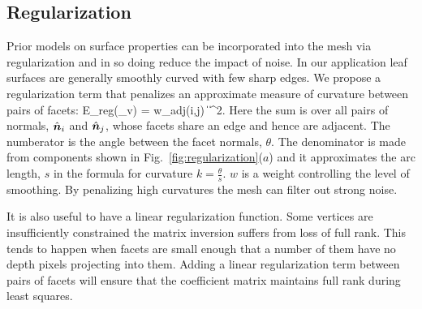 \subsection{Regularization}

Prior models on surface properties can be incorporated into the mesh via regularization and in so doing reduce the impact of noise.  In our application leaf surfaces are generally smoothly curved with few sharp edges.  We propose a regularization term that penalizes an approximate measure of curvature between pairs of facets: 
\beq
E_{reg}(\vlambda_v) = w\sum_{adj(i,j)} \|  \|^2. \label{eq:reg}
\eeq
Here the sum is over all pairs of normals, $\hat{\boldsymbol{n}}_i$ and $\hat{\boldsymbol{n}}_j$, whose facets share an edge and hence are adjacent.  The numberator is the angle between the facet normals, $\theta$. The denominator is made from components shown in Fig.~\ref{fig:regularization}($a$) and it approximates the arc length, $s$ in the formula for curvature $k=\frac{\theta}{s}$.  $w$ is a weight controlling the level of smoothing.  By penalizing high curvatures the mesh can filter out strong noise.

It is also useful to have a linear regularization function.  Some vertices are insufficiently constrained the matrix inversion suffers from loss of full rank.  This tends to happen when facets are small enough that a number of them have no depth pixels projecting into them.  Adding a linear regularization term between pairs of facets will ensure that the coefficient matrix maintains full rank during least squares.

